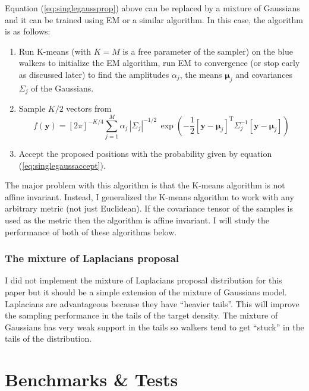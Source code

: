 \documentclass[12pt,preprint]{aastex}
\newcommand{\Eq}[1]{Equation (\ref{eq:#1})}
\newcommand{\eq}[1]{equation (\ref{eq:#1})}
\begin{document}
\Eq{singlegaussprop} above can be replaced by a mixture of Gaussians and it can
be trained using EM or a similar algorithm. In this case, the algorithm is
as follows:
\begin{enumerate}
    \item{
        Run K-means (with $K=M$ is a free parameter of the sampler) on the blue
        walkers to initialize the EM algorithm, run EM
        to convergence (or stop early as discussed later) to find the amplitudes
        $\alpha_j$, the means $\boldsymbol{\mu}_j$ and covariances $\Sigma_j$ of the Gaussians.
        }
    \item{
        Sample $K/2$ vectors from
        \begin{equation}
            f(\mathbf{y}) = [2 \pi]^{-K/4} \sum _{j=1} ^{M} \alpha_j \, \left | \Sigma_j \right |^{-1/2} \,
            \exp \left ( -\frac{1}{2} [\mathbf{y} - \boldsymbol{\mu}_j]^\mathrm{T}
            \Sigma_j^{-1} [\mathbf{y} - \boldsymbol{\mu}_j] \right )
        \end{equation}
        }
    \item{
        Accept the proposed positions with the probability given by \eq{singlegaussaccept}.
        }
\end{enumerate}

The major problem with this algorithm is that the K-means algorithm is not affine
invariant.  Instead, I generalized the K-means algorithm to work with any arbitrary
metric (not just Euclidean).  If the covariance tensor of the samples is used as
the metric then the algorithm is affine invariant.  I will study the performance of
both of these algorithms below.

\subsubsection{The mixture of Laplacians proposal}

I did not implement the mixture of Laplacians proposal distribution for this paper
but it should be a simple extension of the mixture of Gaussians model. Laplacians
are advantageous because they have ``heavier tails''. This will improve the sampling
performance in the tails of the target density. The mixture of Gaussians has very weak
support in the tails so walkers tend to get ``stuck'' in the tails of the distribution.

\section{Benchmarks \& Tests}
\end{document}
